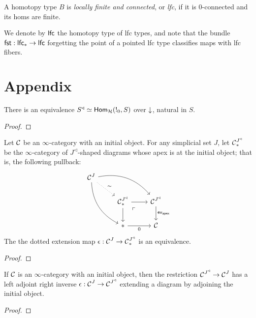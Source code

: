 \begin{defn}
A homotopy type $B$ is \emph{locally finite and connected}, or \emph{lfc}, if it
is $0$-connected and its homs are finite.

We denote by $\mathsf{{lfc}}$ the homotopy type of lfc types, and note that the
bundle $\operatorname{\mathsf{{fst}}} : \mathsf{{lfc}}_{\ast} \to \mathsf{{lfc}}$ forgetting the point of a
pointed lfc type classifies maps with lfc fibers.
\end{defn}



\section{Appendix}
\begin{lem}\label{lem:slice.cone.equiv}
There is an equivalence $S^{\triangleleft} \simeq \operatorname{\mathsf{Hom}}_{\operatorname{\mathcal{H}}}(!_0, S)$ over
$\mathbin{\downarrow}$, natural in $S$.
\end{lem}
\begin{proof}
\end{proof}

\begin{lem}\label{lem:cone.initial.equivalence}
Let $\operatorname{\mathcal{C}}$ be an $\infty$-category with an initial object. For any simplicial set
$J$, let $\operatorname{\mathcal{C}}^{J^{\triangleleft}}_{\ast}$ be the $\infty$-category of
  $J^{\triangleleft}$-shaped diagrams whose apex is at the initial object; that
  is, the following pullback:
  \[
    \begin{tikzcd}
      \Ca^{J} \arrow[drr, bend left] \arrow[ddr, bend right] \arrow[dr,
      dotted, "\sim"] & & \\
      & \Ca^{J^{\triangleleft}}_{\ast} \arrow[d] \arrow[r] \arrow[dr, phantom,
      "\ulcorner" very near start] & \Ca^{J^{\triangleleft}} \arrow[d,
      "\term{ev}_{\term{apex}}"] \\
      & \ast \arrow[r, "0"'] & \Ca
    \end{tikzcd}
  \]
The the dotted extension map  $\epsilon : \operatorname{\mathcal{C}}^{J} \to \operatorname{\mathcal{C}}^{J^{\triangleleft}}_{\ast}$ is an equivalence.
\end{lem}
\begin{proof}
\end{proof}

\begin{lem}\label{lem:kan.extending.cone.adds.initial}
If $\operatorname{\mathcal{C}}$ is an $\infty$-category with an initial object, then the restriction
$\operatorname{\mathcal{C}}^{J^{\triangleleft}} \to \operatorname{\mathcal{C}}^{J}$ has a left adjoint right inverse $\epsilon
: \operatorname{\mathcal{C}}^J \to \operatorname{\mathcal{C}}^{J^{\triangleleft}}$ extending a diagram by adjoining the
initial object. 
\end{lem}
\begin{proof}
\end{proof}


